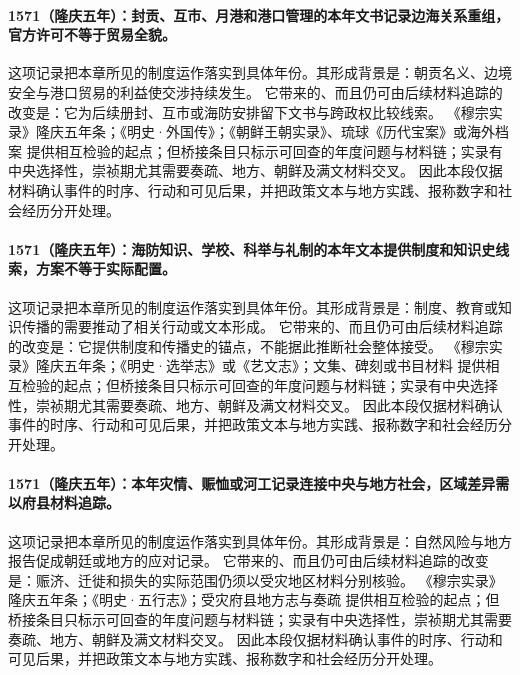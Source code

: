\paragraph{1571（隆庆五年）：封贡、互市、月港和港口管理的本年文书记录边海关系重组，官方许可不等于贸易全貌。} 这项记录把本章所见的制度运作落实到具体年份。其形成背景是：朝贡名义、边境安全与港口贸易的利益使交涉持续发生。 它带来的、而且仍可由后续材料追踪的改变是：它为后续册封、互市或海防安排留下文书与跨政权比较线索。 《穆宗实录》隆庆五年条；《明史·外国传》；《朝鲜王朝实录》、琉球《历代宝案》或海外档案 提供相互检验的起点；但桥接条目只标示可回查的年度问题与材料链；实录有中央选择性，崇祯期尤其需要奏疏、地方、朝鲜及满文材料交叉。 因此本段仅据材料确认事件的时序、行动和可见后果，并把政策文本与地方实践、报称数字和社会经历分开处理。

\paragraph{1571（隆庆五年）：海防知识、学校、科举与礼制的本年文本提供制度和知识史线索，方案不等于实际配置。} 这项记录把本章所见的制度运作落实到具体年份。其形成背景是：制度、教育或知识传播的需要推动了相关行动或文本形成。 它带来的、而且仍可由后续材料追踪的改变是：它提供制度和传播史的锚点，不能据此推断社会整体接受。 《穆宗实录》隆庆五年条；《明史·选举志》或《艺文志》；文集、碑刻或书目材料 提供相互检验的起点；但桥接条目只标示可回查的年度问题与材料链；实录有中央选择性，崇祯期尤其需要奏疏、地方、朝鲜及满文材料交叉。 因此本段仅据材料确认事件的时序、行动和可见后果，并把政策文本与地方实践、报称数字和社会经历分开处理。

\paragraph{1571（隆庆五年）：本年灾情、赈恤或河工记录连接中央与地方社会，区域差异需以府县材料追踪。} 这项记录把本章所见的制度运作落实到具体年份。其形成背景是：自然风险与地方报告促成朝廷或地方的应对记录。 它带来的、而且仍可由后续材料追踪的改变是：赈济、迁徙和损失的实际范围仍须以受灾地区材料分别核验。 《穆宗实录》隆庆五年条；《明史·五行志》；受灾府县地方志与奏疏 提供相互检验的起点；但桥接条目只标示可回查的年度问题与材料链；实录有中央选择性，崇祯期尤其需要奏疏、地方、朝鲜及满文材料交叉。 因此本段仅据材料确认事件的时序、行动和可见后果，并把政策文本与地方实践、报称数字和社会经历分开处理。

